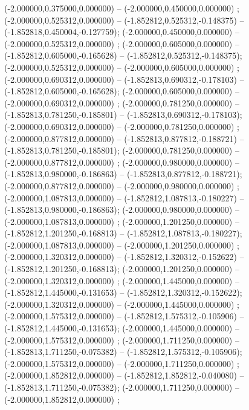  (-2.000000,0.375000,0.000000) -- (-2.000000,0.450000,0.000000) ;
 (-2.000000,0.525312,0.000000) -- (-1.852812,0.525312,-0.148375) -- (-1.852818,0.450004,-0.127759);
 (-2.000000,0.450000,0.000000) -- (-2.000000,0.525312,0.000000) ;
 (-2.000000,0.605000,0.000000) -- (-1.852812,0.605000,-0.165628) -- (-1.852812,0.525312,-0.148375);
 (-2.000000,0.525312,0.000000) -- (-2.000000,0.605000,0.000000) ;
 (-2.000000,0.690312,0.000000) -- (-1.852813,0.690312,-0.178103) -- (-1.852812,0.605000,-0.165628);
 (-2.000000,0.605000,0.000000) -- (-2.000000,0.690312,0.000000) ;
 (-2.000000,0.781250,0.000000) -- (-1.852813,0.781250,-0.185801) -- (-1.852813,0.690312,-0.178103);
 (-2.000000,0.690312,0.000000) -- (-2.000000,0.781250,0.000000) ;
 (-2.000000,0.877812,0.000000) -- (-1.852813,0.877812,-0.188721) -- (-1.852813,0.781250,-0.185801);
 (-2.000000,0.781250,0.000000) -- (-2.000000,0.877812,0.000000) ;
 (-2.000000,0.980000,0.000000) -- (-1.852813,0.980000,-0.186863) -- (-1.852813,0.877812,-0.188721);
 (-2.000000,0.877812,0.000000) -- (-2.000000,0.980000,0.000000) ;
 (-2.000000,1.087813,0.000000) -- (-1.852812,1.087813,-0.180227) -- (-1.852813,0.980000,-0.186863);
 (-2.000000,0.980000,0.000000) -- (-2.000000,1.087813,0.000000) ;
 (-2.000000,1.201250,0.000000) -- (-1.852812,1.201250,-0.168813) -- (-1.852812,1.087813,-0.180227);
 (-2.000000,1.087813,0.000000) -- (-2.000000,1.201250,0.000000) ;
 (-2.000000,1.320312,0.000000) -- (-1.852812,1.320312,-0.152622) -- (-1.852812,1.201250,-0.168813);
 (-2.000000,1.201250,0.000000) -- (-2.000000,1.320312,0.000000) ;
 (-2.000000,1.445000,0.000000) -- (-1.852812,1.445000,-0.131653) -- (-1.852812,1.320312,-0.152622);
 (-2.000000,1.320312,0.000000) -- (-2.000000,1.445000,0.000000) ;
 (-2.000000,1.575312,0.000000) -- (-1.852812,1.575312,-0.105906) -- (-1.852812,1.445000,-0.131653);
 (-2.000000,1.445000,0.000000) -- (-2.000000,1.575312,0.000000) ;
 (-2.000000,1.711250,0.000000) -- (-1.852813,1.711250,-0.075382) -- (-1.852812,1.575312,-0.105906);
 (-2.000000,1.575312,0.000000) -- (-2.000000,1.711250,0.000000) ;
 (-2.000000,1.852812,0.000000) -- (-1.852812,1.852812,-0.040080) -- (-1.852813,1.711250,-0.075382);
 (-2.000000,1.711250,0.000000) -- (-2.000000,1.852812,0.000000) ;
